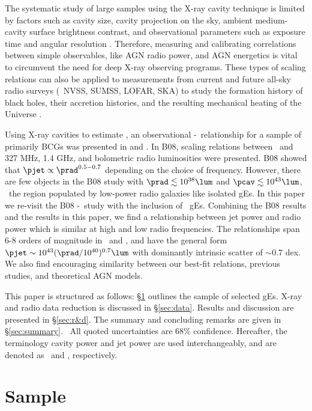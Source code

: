 \documentclass{emulateapj}
\begin{document}
The systematic study of large samples using the X-ray cavity technique
is limited by factors such as cavity size, cavity projection on the
sky, ambient medium-cavity surface brightness contrast, and
observational parameters such as exposure time and angular resolution
\citep{2009arXiv0909.0397B}. Therefore, measuring and calibrating
correlations between simple observables, like AGN radio power, and AGN
energetics is vital to circumvent the need for deep X-ray observing
programs. These types of scaling relations can also be applied to
measurements from current and future all-sky radio surveys (\eg\ NVSS,
SUMSS, LOFAR, SKA) to study the formation history of black holes,
their accretion histories, and the resulting mechanical heating of the
Universe \citep{croton06, 2006MNRAS.366..397S}.

Using X-ray cavities to estimate \pjet, an observational
\pjet-\prad\ relationship for a sample of primarily BCGs was presented
in \citet[][hereafter B04]{birzan04} and \citet[][hereafter
  B08]{birzan08}. In B08, scaling relations between \pjet\ and 327
MHz, 1.4 GHz, and bolometric radio luminosities were presented. B08
showed that $\pjet \propto \prad^{0.5-0.7}$ depending on the choice of
frequency. However, there are few objects in the B08 study with $\prad
\lesssim 10^{38} \lum$ and $\pcav \lesssim 10^{43} \lum$, \ie\ the
region populated by low-power radio galaxies like isolated gEs. In
this paper we re-visit the B08 \pjet-\prad\ study with the inclusion
of \samp\ gEs. Combining the B08 results and the results in this
paper, we find a relationship between jet power and radio power which
is similar at high and low radio frequencies. The relationships span
6-8 orders of magnitude in \pjet\ and \prad, and have the general form
$\pjet \sim 10^{43} (\prad/10^{40})^{0.7} \lum$ with dominantly
intrinsic scatter of $\sim 0.7$ dex. We also find encouraging
similarity between our best-fit relations, previous studies, and
theoretical AGN models.

This paper is structured as follows: \S\ref{sec:sample} outlines the
sample of selected gEs. X-ray and radio data reduction is discussed in
\S\ref{sec:data}. Results and discussion are presented in
\S\ref{sec:r&d}. The summary and concluding remarks are given in
\S\ref{sec:summary}. \LCDM\ All quoted uncertainties are 68\%
confidence. Hereafter, the terminology cavity power and jet power are
used interchangeably, and are denoted as \pcav\ and \pjet,
respectively.

\section{Sample}
\label{sec:sample}
\end{document}
